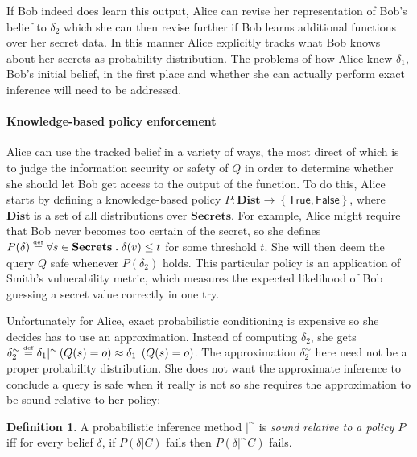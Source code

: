 \documentclass{article} %
\newcommand{\ra}{\rightarrow}
\newcommand{\secrets}[0]{\textbf{Secrets}}
\newcommand{\dists}[0]{\textbf{Dist}}
\newcommand{\sconst}[1]{\ensuremath{\mathsf{#1}}}
\newcommand{\strue}{\sconst{True}}
\newcommand{\sfalse}{\sconst{False}}
\newcommand{\paren}[1]{\left( #1 \right)}
\newcommand{\set}[1]{\left\{ #1 \right\}}
\newcommand{\acond}[0]{|^\sim}
\newcommand{\qsep}[0]{\; . \;}
\newcommand{\stacklabel}[1]{\stackrel{\smash{\scriptscriptstyle \mathrm{#1}}}}
\newcommand{\defeq}{\stacklabel{def}=}
\theoremstyle{plain} %
\theoremstyle{definition} %
\newtheorem*{definition-un}{Definition}
\begin{document}
If Bob indeed does learn this output, Alice can revise her
representation of Bob's belief to $ \delta_2 $ which she can then
revise further if Bob learns additional functions over her secret
data. In this manner Alice explicitly tracks what Bob knows about her
secrets as probability distribution. The problems of how Alice knew $
\delta_1 $, Bob's initial belief, in the first place and whether she
can actually perform exact inference will need to be addressed.

\paragraph{Knowledge-based policy enforcement}
Alice can use the tracked belief in a variety of ways, the most direct
of which is to judge the information security or safety of $ Q $ in
order to determine whether she should let Bob get access to the output
of the function. To do this, Alice starts by defining a
knowledge-based policy $ P : \dists \ra \set{\strue,\sfalse} $, where
$ \dists $ is a set of all distributions over $ \secrets $. For
example, Alice might require that Bob never becomes too certain of the
secret, so she defines $ P(\delta) \defeq \forall s \in \secrets \qsep
\delta(v) \leq t $ for some threshold $ t $. She will then deem the
query $ Q $ safe whenever $ P(\delta_2) $ holds. This particular
policy is an application of Smith's vulnerability
metric\cite{smith09foundations}, which measures the expected
likelihood of Bob guessing a secret value correctly in one try.

Unfortunately for Alice, exact probabilistic conditioning is expensive
so she decides has to use an approximation. Instead of computing $
\delta_2 $, she gets $ \delta_2^\sim \defeq \delta_1 \acond
\paren{Q(s) = o} \approx \delta_1 | \paren{Q(s) = o} $. The
approximation $ \delta_2^\sim $ here need not be a proper probability
distribution. She does not want the approximate inference to conclude
a query is safe when it really is not so she requires the
approximation to be sound relative to her policy:

\begin{definition-un} A probabilistic inference method $ |^\sim $ is
  \emph{sound relative to a policy $ P $} iff for every belief $
  \delta $, if $ P(\delta | C) $ fails then $ P(\delta |^\sim C) $
  fails.
\end{definition-un}
\end{document}
